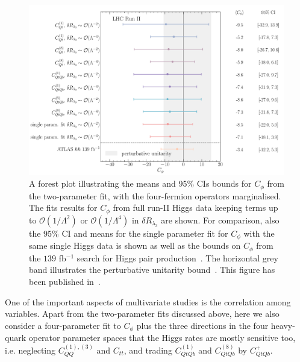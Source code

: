 	\begin{figure}[htpb!]
		\begin{center}
			\includegraphics[width=\linewidth]{fig/uebeblick_forest_cphi_LHC_RunII}
		\end{center}
		\caption{A forest plot illustrating the means and 95\% CIs bounds for $C_\phi$ from the two-parameter fit, with the four-fermion operators marginalised. The fits results for $C_\phi$ from full run-II Higgs data keeping terms up to $\mathcal{O}(1/\Lambda^2)$ or $\mathcal{O}(1/\Lambda^4)$ in $\delta R_{\lambda_3}$ are shown.  For comparison, also the 95\% CI and means for the single parameter fit for $C_\phi$ with the same single Higgs data is shown as well as the bounds on $C_{\phi}$ from the $139$ fb$^{-1}$ search for Higgs pair production~\cite{ATLAS:2021jki}. The horizontal grey band illustrates the perturbative unitarity bound~\cite{DiLuzio:2017tfn}. This figure has been published in~\cite{Alasfar:2022zyr}.\label{fig:summcphi}  }
	\end{figure}
	\par 
	One of the important aspects of multivariate studies is the correlation among variables. Apart from the two-parameter fits discussed above, here we also consider a four-parameter fit to $C_\phi$ plus the three directions in the four heavy-quark operator parameter spaces that the Higgs rates are
	mostly sensitive too, i.e. neglecting $C_{QQ}^{(1),(3) }$ and $C_{tt}$, and trading $C_{QtQb}^{(1)}$ and $C_{QtQb}^{(8)}$ by $C_{QtQb}^{+}$.
